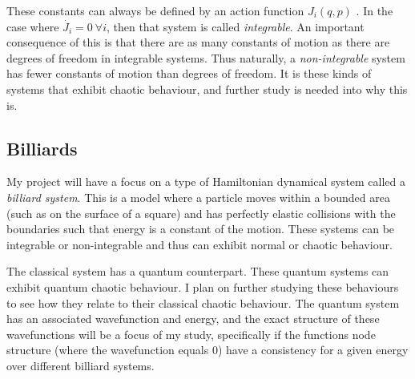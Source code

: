 \documentclass[12pt,a4paper]{amsart}
\begin{document}

These constants can always be defined by an action function $J_{i}(q, p)$ \cite{HILBORN}. In the case where $\dot{J_{i}} = 0 \ \forall i$, then that system is called \textit{integrable}. An important consequence of this is that there are as many constants of motion as there are degrees of freedom in integrable systems. Thus naturally, a \textit{non-integrable} system has fewer constants of motion than degrees of freedom. It is these kinds of systems that exhibit chaotic behaviour, and further study is needed into why this is.

 

\subsection{Billiards}

My project will have a focus on a type of Hamiltonian dynamical system called a \textit{billiard system}. This is a model where a particle moves within a bounded area (such as on the surface of a square) and has perfectly elastic collisions with the boundaries such that energy is a constant of the motion. These systems can be integrable or non-integrable and thus can exhibit normal or chaotic behaviour. 

The classical system has a quantum counterpart. These quantum systems can exhibit quantum chaotic behaviour. I plan on further studying these behaviours to see how they relate to their classical chaotic behaviour. The quantum system has an associated wavefunction and energy, and the exact structure of these wavefunctions will be a focus of my study, specifically if the functions node structure (where the wavefunction equals 0) have a consistency for a given energy over different billiard systems.

\end{document}

